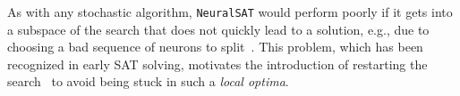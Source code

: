 \documentclass[oneside,11pt,dvipsnames]{book}
\numberwithin{equation}{section}
\theoremstyle{definition}
\theoremstyle{remark}
\newcommand{\tool}{\texttt{NeuralSAT}}
\begin{document}

As with any stochastic algorithm, \tool{} would perform poorly if it gets into a subspace of the search that does not quickly lead to a solution, e.g., due to choosing a bad sequence of neurons to split~\cite{ferrari2022complete,wang2021beta,de2021improved}.
This problem, which has been recognized in early SAT solving, motivates the introduction of restarting the search~\cite{gomes1998boosting} to avoid being stuck in such a \emph{local optima}. %


\end{document}
